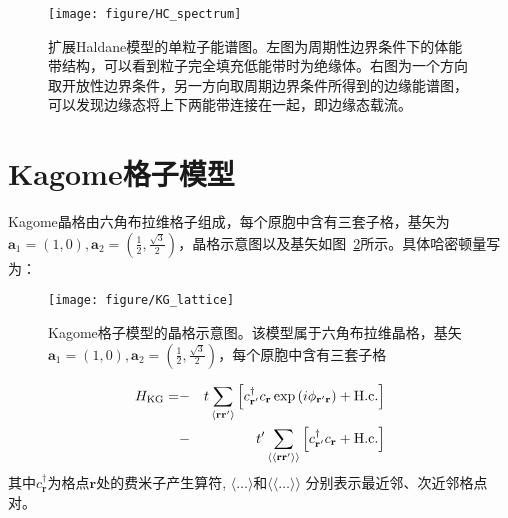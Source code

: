 \begin{figure}[h]
  \centering
  \texttt{[image: figure/HC\_spectrum]}
\caption{扩展Haldane模型的单粒子能谱图。左图为周期性边界条件下的体能带结构，可以看到粒子完全填充低能带时为绝缘体。右图为一个方向取开放性边界条件，另一方向取周期边界条件所得到的边缘能谱图，可以发现边缘态将上下两能带连接在一起，即边缘态载流。}
\label{fig:hc_spectrum}
\end{figure}


\section{Kagome格子模型}
Kagome晶格由六角布拉维格子组成，每个原胞中含有三套子格，基矢为$\textbf{a}_1=(1,0),\textbf{a}_2=(\frac{1}{2},\frac{\sqrt{3}}{2})$，晶格示意图以及基矢如图~\ref{fig:KG_lattice}所示。具体哈密顿量写为：

\begin{figure}
 \centering
 \texttt{[image: figure/KG\_lattice]}
 \caption{Kagome格子模型的晶格示意图。该模型属于六角布拉维晶格，基矢$\textbf{a}_1=(1,0),\textbf{a}_2=(\frac{1}{2},\frac{\sqrt{3}}{2})$，每个原胞中含有三套子格}
 \label{fig:KG_lattice}
\end{figure}


\begin{eqnarray}
H_{\rm KG}= &-&t\sum_{\langle\mathbf{r}\mathbf{r}^{ \prime}\rangle}
\left[c^{\dagger}_{\mathbf{r}^{ \prime}}c_{\mathbf{r}}\exp\left(i\phi_{\mathbf{r}^{ \prime}\mathbf{r}}\right)+\textrm{H.c.}\right]\nonumber\\
&-&t^{\prime}\sum_{\langle\langle\mathbf{r}\mathbf{r}^{\prime}\rangle\rangle}
\left[c^{\dagger}_{\mathbf{r}^{\prime}}c_{\mathbf{r}}+\textrm{H.c.}\right]%
\label{eq:kg}
\end{eqnarray}
其中$c^{\dagger}_{\mathbf{r}}$为格点$\mathbf{r}$处的费米子产生算符,  $\langle\dots\rangle$和$\langle\langle\dots\rangle\rangle$ 分别表示最近邻、次近邻格点对。

